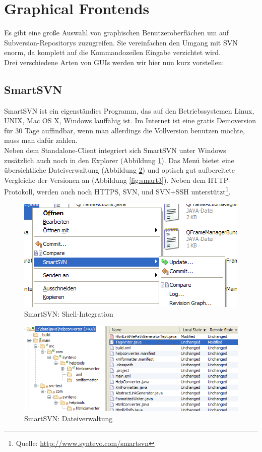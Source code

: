 \section{Graphical Frontends}
Es gibt eine große Auswahl von graphischen Benutzeroberflächen um auf Subversion-Repositorys zuzugreifen. Sie vereinfachen den Umgang mit SVN enorm, da komplett auf die Kommandozeilen Eingabe verzichtet wird.\\
Drei verschiedene Arten von GUIs werden wir hier nun kurz  vorstellen:
\subsection{SmartSVN}
SmartSVN ist ein eigenständies Programm, das auf den Betriebssystemen Linux, UNIX, Mac OS X, Windows lauffähig ist. Im Internet ist eine gratis Demoversion für 30 Tage auffindbar, wenn man allerdings die Vollversion benutzen möchte, muss man dafür zahlen.\\
Neben dem Standalone-Client integriert sich SmartSVN unter Windows zusätzlich auch noch in den Explorer (Abbildung \ref{fig:smart1}). Das Menü bietet eine übersichtliche Dateiverwaltung (Abbildung \ref{fig:smart2}) und optisch gut aufbereitete Vergleiche der Versionen an (Abbildung \ref{fig:smart3}).
Neben dem HTTP-Protokoll, werden auch noch HTTPS, SVN, und SVN+SSH unterstützt\footnote{Quelle: \url{http://www.syntevo.com/smartsvn}}.
\begin{figure}[!htb]
        \centering
        \includegraphics[width=.8\textwidth]{1_smartsvn1.png}
        \caption{SmartSVN: Shell-Integration}
        \label{fig:smart1}
\end{figure}
\begin{figure}[!htb]
        \centering
        \includegraphics[width=.9\textwidth]{2_smartsvn2.png}
        \caption{SmartSVN: Dateiverwaltung}
        \label{fig:smart2}
\end{figure}
